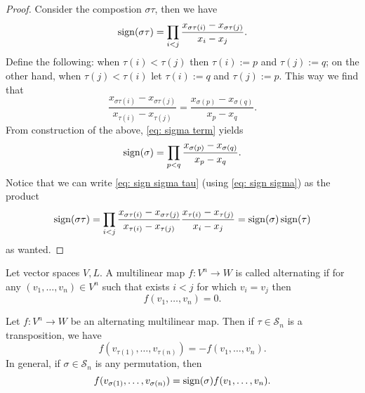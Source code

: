\begin{proof}
  Consider the compostion \(\sigma \tau\), then we have
  \begin{equation}\label{eq: sign sigma tau}
     \operatorname{sign}(\sigma \tau) = \prod_{i < j} \frac{x_{\sigma\tau(i)} -
     x_{\sigma\tau(j)}}{x_i - x_j}.
  \end{equation}
  Define the following: when \(\tau(i) < \tau(j)\) then \(\tau(i) := p\) and
  \(\tau(j) := q\); on the other hand, when \(\tau(j) < \tau(i)\) let \(\tau(i)
  := q\) and \(\tau(j) := p\). This way we find that
  \begin{equation}\label{eq: sigma term}
    \frac{x_{\sigma\tau(i)} - x_{\sigma\tau(j)}}{x_{\tau(i)} - x_{\tau(j)}}
    = \frac{x_{\sigma(p)} - x_{\sigma(q)}}{x_p - x_q}.
  \end{equation}
  From construction of the above, \cref{eq: sigma term} yields
  \begin{equation}\label{eq: sign sigma}
    \operatorname{sign}(\sigma) = \prod_{p < q} \frac{x_{\sigma(p)} -
    x_{\sigma(q)}}{x_p - x_q}.
  \end{equation}
  Notice that we can write \cref{eq: sign sigma tau} (using \cref{eq: sign
  sigma}) as the product
  \[
    \operatorname{sign}(\sigma \tau) = \prod_{i < j}
    \frac{x_{\sigma \tau(i)} - x_{\sigma \tau(j)}}{x_{\tau(i)} - x_{\tau(j)}}
    \frac{x_{\tau(i)} - x_{\tau(j)}}{x_i - x_j}
    = \operatorname{sign}(\sigma) \operatorname{sign}(\tau)
  \]
  as wanted.
\end{proof}

\begin{definition}
  \label{def: alternating map}
  Let vector spaces \(V, L\). A multilinear map \(f: V^n \to W\) is called
  alternating if for any \((v_1, \dots, v_n) \in V^n\) such
  that exists \(i < j\) for which \(v_i = v_j\) then
  \[
    f(v_1, \dots, v_n) = 0.
  \] 
\end{definition}

\begin{proposition}\label{prop: alternating map property}
  Let \(f: V^n \to W\) be an alternating multilinear map. Then if \(\tau \in
  \mathcal S_n\) is a transposition, we have
  \[
    f(v_{\tau(1)}, \dots, v_{\tau(n)}) = - f(v_1, \dots, v_n).
  \] 
  In general, if \(\sigma \in \mathcal S_n\) is any permutation, then
  \[
    f(v_{\sigma(1)}, \dots, v_{\sigma(n)}) = \operatorname{sign}(\sigma) f(v_1,
    \dots, v_n).
  \] 
\end{proposition}

